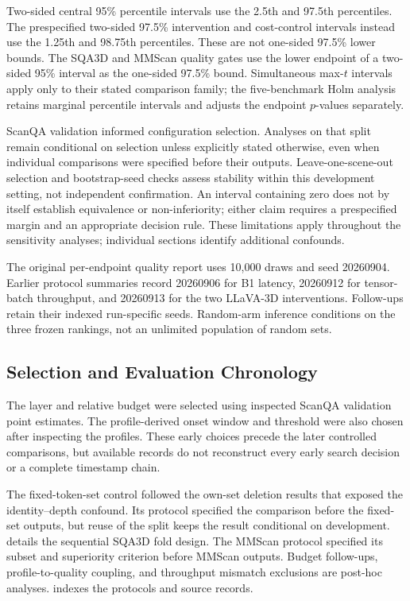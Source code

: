 Two-sided central 95\% percentile intervals use the 2.5th and 97.5th percentiles. The prespecified two-sided 97.5\% intervention and cost-control intervals instead use the 1.25th and 98.75th percentiles. These are not one-sided 97.5\% lower bounds. The SQA3D and MMScan quality gates use the lower endpoint of a two-sided 95\% interval as the one-sided 97.5\% bound. Simultaneous max-$t$ intervals apply only to their stated comparison family; the five-benchmark Holm analysis retains marginal percentile intervals and adjusts the endpoint $p$-values separately.

ScanQA validation informed configuration selection. Analyses on that split remain conditional on selection unless explicitly stated otherwise, even when individual comparisons were specified before their outputs. Leave-one-scene-out selection and bootstrap-seed checks assess stability within this development setting, not independent confirmation. An interval containing zero does not by itself establish equivalence or non-inferiority; either claim requires a prespecified margin and an appropriate decision rule. These limitations apply throughout the sensitivity analyses; individual sections identify additional confounds.

The original per-endpoint quality report uses 10,000 draws and seed 20260904. Earlier protocol summaries record 20260906 for B1 latency, 20260912 for tensor-batch throughput, and 20260913 for the two LLaVA-3D interventions. Follow-ups retain their indexed run-specific seeds. Random-arm inference conditions on the three frozen rankings, not an unlimited population of random sets.

\subsection{Selection and Evaluation Chronology}
\label{sec:supp_selection}

The layer and relative budget were selected using inspected ScanQA validation point estimates. The profile-derived onset window and threshold were also chosen after inspecting the profiles. These early choices precede the later controlled comparisons, but available records do not reconstruct every early search decision or a complete timestamp chain.

The fixed-token-set control followed the own-set deletion results that exposed the identity--depth confound. Its protocol specified the comparison before the fixed-set outputs, but reuse of the split keeps the result conditional on development.  details the sequential SQA3D fold design. The MMScan protocol specified its subset and superiority criterion before MMScan outputs. Budget follow-ups, profile-to-quality coupling, and throughput mismatch exclusions are post-hoc analyses.  indexes the protocols and source records.
